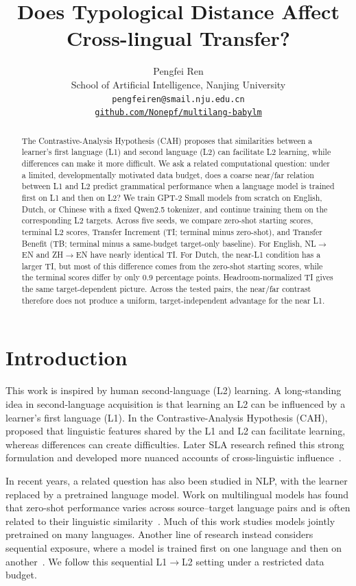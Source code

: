 \documentclass[11pt]{article}
\title{Does Typological Distance Affect Cross-lingual Transfer?}
\author{Pengfei Ren \\
  School of Artificial Intelligence, Nanjing University \\
  \texttt{pengfeiren@smail.nju.edu.cn} \\
  \href{https://github.com/Nonepf/multilang-babylm}{\texttt{github.com/Nonepf/multilang-babylm}}
}
\begin{document}
\maketitle

\begin{abstract}

The Contrastive-Analysis Hypothesis (CAH) \citep{Lado1957} proposes that similarities between a learner's first language (L1) and second language (L2) can facilitate L2 learning, while differences can make it more difficult. We ask a related computational question: under a limited, developmentally motivated data budget, does a coarse near/far relation between L1 and L2 predict grammatical performance when a language model is trained first on L1 and then on L2? We train GPT-2 Small models from scratch on English, Dutch, or Chinese with a fixed Qwen2.5 tokenizer, and continue training them on the corresponding L2 targets. Across five seeds, we compare zero-shot starting scores, terminal L2 scores, Transfer Increment (TI; terminal minus zero-shot), and Transfer Benefit (TB; terminal minus a same-budget target-only baseline). For English, NL$\rightarrow$EN and ZH$\rightarrow$EN have nearly identical TI. For Dutch, the near-L1 condition has a larger TI, but most of this difference comes from the zero-shot starting scores, while the terminal scores differ by only 0.9 percentage points. Headroom-normalized TI gives the same target-dependent picture. Across the tested pairs, the near/far contrast therefore does not produce a uniform, target-independent advantage for the near L1.

\end{abstract}

\section{Introduction}

This work is inspired by human second-language (L2) learning. A long-standing idea in second-language acquisition is that learning an L2 can be influenced by a learner's first language (L1). In the Contrastive-Analysis Hypothesis (CAH), \citet{Lado1957} proposed that linguistic features shared by the L1 and L2 can facilitate learning, whereas differences can create difficulties. Later SLA research refined this strong formulation and developed more nuanced accounts of cross-linguistic influence~\citep{Odlin1989,Ringbom2006,JarvisPavlenko2008}.

In recent years, a related question has also been studied in NLP, with the learner replaced by a pretrained language model. Work on multilingual models has found that zero-shot performance varies across source--target language pairs and is often related to their linguistic similarity~\citep{pires-etal-2019-multilingual,lauscher-etal-2020-zero}. Much of this work studies models jointly pretrained on many languages. Another line of research instead considers sequential exposure, where a model is trained first on one language and then on another~\citep{oba-etal-2023-second,yadavalli-etal-2023-slabert,gogoulou-etal-2024-continual-clean}. We follow this sequential L1$\rightarrow$L2 setting under a restricted data budget.
\end{document}
